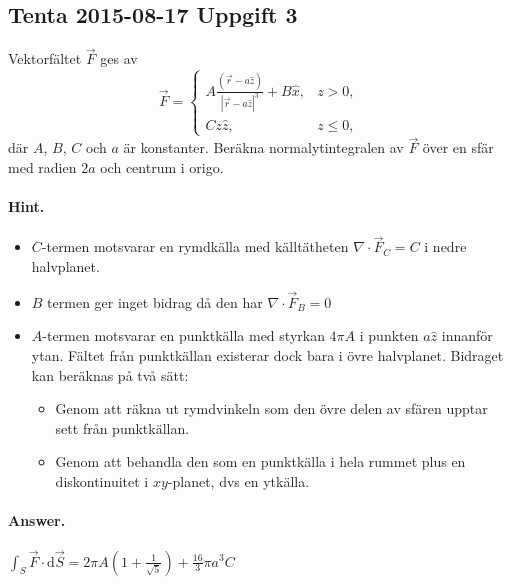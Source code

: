 \documentclass[%
oneside,                 %
final,                   %
10pt]{article}
\newenvironment{doconceexercise}{}{}
\newcounter{doconceexercisecounter}
\begin{document}
\begin{doconceexercise}

\subsection{Tenta 2015-08-17 Uppgift 3}

Vektorfältet $\vec{F}$ ges av 
$$
\vec{F} = \left\{
\begin{array}{ll}
  A \frac{(\vec{r} - a\hat{z})}{| \vec{r} - a \hat{z}|^3} + B \hat{x}, & z>0, \\
  C z \hat{z}, & z \le 0,
\end{array}
\right.
$$
där $A$, $B$, $C$ och $a$ är konstanter. Beräkna normalytintegralen av
$\vec{F}$ över en sfär med radien $2a$ och centrum i origo.


\paragraph{Hint.}
\begin{itemize}
\item $C$-termen motsvarar en rymdkälla med källtätheten $\nabla \cdot \vec{F}_C = C$ i nedre halvplanet.

\item $B$ termen ger inget bidrag då den har $\nabla \cdot \vec{F}_B = 0$

\item $A$-termen motsvarar en punktkälla med styrkan $4 \pi A$ i punkten $a \hat{z}$ innanför ytan. Fältet från punktkällan existerar dock bara i övre halvplanet. Bidraget kan beräknas på två sätt:
\begin{itemize}

  \item Genom att räkna ut rymdvinkeln som den övre delen av sfären upptar sett från punktkällan.

  \item Genom att behandla den som en punktkälla i hela rummet plus en diskontinuitet i $xy$-planet, dvs en ytkälla.
\end{itemize}

\noindent
\end{itemize}

\noindent


\paragraph{Answer.}
$\int_S \vec{F} \cdot \mbox{d}\vec{S} = 2
\pi A \left(1 + \frac{1}{\sqrt{5}} \right) + \frac{16}{3} \pi a^3 C$


\end{doconceexercise}
\end{document}
